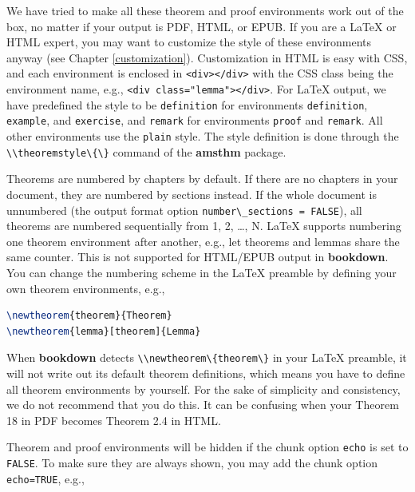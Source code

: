 \documentclass[doctor,openright,twoside]{sjtuthesis}
\newcommand{\passthrough}[1]{#1}
\theoremstyle{plain}
\theoremstyle{definition}
\theoremstyle{remark}
\theoremstyle{ocrenumbox}
\theoremstyle{plain}
\begin{document}
We have tried to make all these theorem and proof environments work out of the box, no matter if your output is PDF, HTML, or EPUB. If you are a LaTeX or HTML expert, you may want to customize the style of these environments anyway (see Chapter \ref{customization}). Customization in HTML is easy with CSS, and each environment is enclosed in \passthrough{\lstinline!<div></div>!} with the CSS class being the environment name, e.g., \passthrough{\lstinline!<div class="lemma"></div>!}. For LaTeX output, we have predefined the style to be \passthrough{\lstinline!definition!} for environments \passthrough{\lstinline!definition!}, \passthrough{\lstinline!example!}, and \passthrough{\lstinline!exercise!}, and \passthrough{\lstinline!remark!} for environments \passthrough{\lstinline!proof!} and \passthrough{\lstinline!remark!}. All other environments use the \passthrough{\lstinline!plain!} style. The style definition is done through the \passthrough{\lstinline!\\theoremstyle\{\}!} command of the \textbf{amsthm} package.

Theorems are numbered by chapters by default. If there are no chapters in your document, they are numbered by sections instead. If the whole document is unnumbered (the output format option \passthrough{\lstinline!number\_sections = FALSE!}), all theorems are numbered sequentially from 1, 2, \ldots, N. LaTeX supports numbering one theorem environment after another, e.g., let theorems and lemmas share the same counter. This is not supported for HTML/EPUB output in \textbf{bookdown}. You can change the numbering scheme in the LaTeX preamble by defining your own theorem environments, e.g.,

\begin{lstlisting}[language=TeX]
\newtheorem{theorem}{Theorem}
\newtheorem{lemma}[theorem]{Lemma}
\end{lstlisting}

When \textbf{bookdown} detects \passthrough{\lstinline!\\newtheorem\{theorem\}!} in your LaTeX preamble, it will not write out its default theorem definitions, which means you have to define all theorem environments by yourself. For the sake of simplicity and consistency, we do not recommend that you do this. It can be confusing when your Theorem 18 in PDF becomes Theorem 2.4 in HTML.

Theorem and proof environments will be hidden if the chunk option \passthrough{\lstinline!echo!} is set to \passthrough{\lstinline!FALSE!}. To make sure they are always shown, you may add the chunk option \passthrough{\lstinline!echo=TRUE!}, e.g.,
\end{document}
